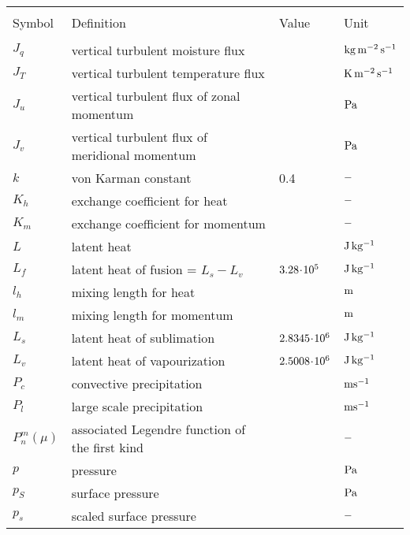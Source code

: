 \begin{tabular*}{\textwidth}{|l@{\extracolsep\fill}lll|}
\hline
\vspace{-3mm} & & & \\
Symbol         & Definition                       & Value   & Unit \\
\hline 
\vspace{-3mm} & & & \\

$J_q$          & vertical turbulent moisture flux           &         & $\rm kg\, m^{-2}\,
s^{-1}$ \\
$J_T$          & vertical turbulent temperature flux        &         & $\rm K\,
m^{-2}\, s^{-1}$ \\
$J_u$          & vertical turbulent flux of zonal momentum  &         & $\rm Pa$
\\
$J_v$          & vertical turbulent flux of meridional momentum &          & $\rm Pa$
\\

$k$       & von Karman constant                   & 0.4          & $\rm -$ \\
$K_h$          & exchange coefficient for heat         &         & $\rm -$ \\
$K_m$          & exchange coefficient for momentum          &         &$\rm -$ \\
$L$       & latent heat                      &         & $\rm J\, kg^{-1}$\\

$L_f$          & latent heat of fusion = $L_s - L_v$        & $\rm 3.28\! \cdot \! 10^{5}$   &
$\rm J\, kg^{-1}$ \\
$l_h$          & mixing length for heat                &         & $\rm m$ \\
$l_m$          & mixing length for momentum            &         &
$\rm m$ \\
$L_s$          & latent heat of sublimation            & $\rm 2.8345\! \cdot \! 10^{6}$ & $\rm J\,
kg^{-1}$ \\
$L_v$          & latent heat of vapourization               & $\rm 2.5008\! \cdot \! 10^{6}$
     & $\rm J\, kg^{-1}$ \\
$P_c$     & convective precipitation    &    &$\rm  m s^{-1}$ \\
$P_l$     & large scale precipitation   &    &$\rm  m s^{-1}$ \\
$P^m_n(\mu)$   & associated Legendre function of the first kind &          & $\rm -$ \\
$p$       & pressure  \hspace*{\fill}             &         & $\rm Pa$ \\
$p_S$          & surface pressure                 &         & $\rm Pa$
\\
$p_s$          & scaled surface pressure               &         & $\rm -$ \\


\end{tabular*}
